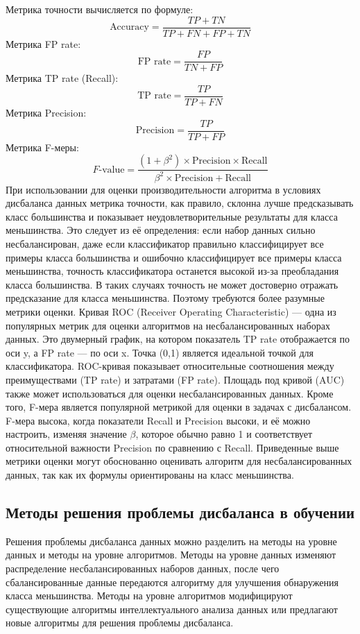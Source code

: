 \documentclass{article}
\begin{document}
Метрика точности вычисляется по формуле:
\[
\text{Accuracy} = \frac{TP + TN}{TP + FN + FP + TN}
\]
Метрика FP rate:
\[
\text{FP rate} = \frac{FP}{TN + FP}
\]
Метрика TP rate (Recall):
\[
\text{TP rate} = \frac{TP}{TP + FN}
\]
Метрика Precision:
\[
\text{Precision} = \frac{TP}{TP + FP}
\]
Метрика F-меры:
\[
F\text{-value} = \frac{(1 + \beta^2) \times \text{Precision} \times \text{Recall}}{\beta^2 \times \text{Precision} + \text{Recall}}
\]
При использовании для оценки производительности алгоритма в условиях дисбаланса данных метрика точности, как правило, склонна лучше предсказывать класс большинства и показывает неудовлетворительные результаты для класса меньшинства. Это следует из её определения: если набор данных сильно несбалансирован, даже если классификатор правильно классифицирует все примеры класса большинства и ошибочно классифицирует все примеры класса меньшинства, точность классификатора останется высокой из-за преобладания класса большинства. В таких случаях точность не может достоверно отражать предсказание для класса меньшинства. Поэтому требуются более разумные метрики оценки.
Кривая ROC (Receiver Operating Characteristic) — одна из популярных метрик для оценки алгоритмов на несбалансированных наборах данных. Это двумерный график, на котором показатель TP rate отображается по оси y, а FP rate — по оси x. Точка (0,1) является идеальной точкой для классификатора. ROC-кривая показывает относительные соотношения между преимуществами (TP rate) и затратами (FP rate). Площадь под кривой (AUC) также может использоваться для оценки несбалансированных данных. Кроме того, F-мера является популярной метрикой для оценки в задачах с дисбалансом. F-мера высока, когда показатели Recall и Precision высоки, и её можно настроить, изменяя значение \(\beta\), которое обычно равно 1 и соответствует относительной важности Precision по сравнению с Recall.
Приведенные выше метрики оценки могут обоснованно оценивать алгоритм для несбалансированных данных, так как их формулы ориентированы на класс меньшинства.
\subsection{ Методы решения проблемы дисбаланса в обучении }
Решения проблемы дисбаланса данных можно разделить на методы на уровне данных и методы на уровне алгоритмов. Методы на уровне данных изменяют распределение несбалансированных наборов данных, после чего сбалансированные данные передаются алгоритму для улучшения обнаружения класса меньшинства. Методы на уровне алгоритмов модифицируют существующие алгоритмы интеллектуального анализа данных или предлагают новые алгоритмы для решения проблемы дисбаланса.
\end{document}
